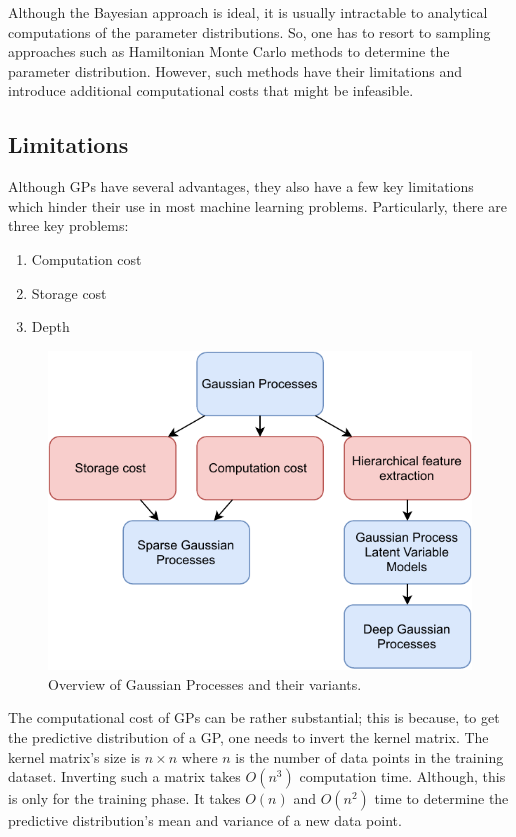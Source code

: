 \documentclass[letterpaper,11pt]{extarticle}
\begin{document}
Although the Bayesian approach is ideal, it is usually intractable to analytical computations of the parameter distributions. So, one has to resort to sampling approaches such as Hamiltonian Monte Carlo methods to determine the parameter distribution. However, such methods have their limitations and introduce additional computational costs that might be infeasible. 

\subsection{Limitations}

Although GPs have several advantages, they also have a few key limitations which hinder their use in most machine learning problems. Particularly, there are three key problems:

\begin{enumerate}
\item Computation cost
\item Storage cost
\item Depth
\end{enumerate}

\begin{figure}[htp]
    \centering
    \includegraphics[width=0.6\linewidth]{figs/GP.pdf}
    \caption{Overview of Gaussian Processes and their variants.}
    \label{fig:overview}
\end{figure}

The computational cost of GPs can be rather substantial; this is because, to get the predictive distribution of a GP, one needs to invert the kernel matrix. The kernel matrix's size is $n \times n$ where $n$ is the number of data points in the training dataset. Inverting such a matrix takes $O(n^3)$ computation time. Although, this is only for the training phase. It takes $O(n)$ and $O(n^2)$ time to determine the predictive distribution's mean and variance of a new data point.
\end{document}
